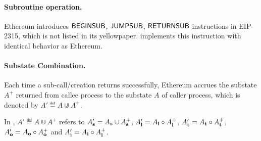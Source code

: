 
\paragraph{Subroutine operation.} Ethereum introduces $\mathsf{BEGINSUB}$, $\mathsf{JUMPSUB}$, $\mathsf{RETURNSUB}$ instructions in EIP-2315, which is not listed in its yellowpaper. 
{\name} implements this instruction with identical behavior as Ethereum.

\paragraph{Substate Combination.} 
Each time a sub-call/creation returns successfully, Ethereum accrues the substate $A^+$ returned from callee process to the substate $A$ of caller process, which is denoted by $A'\eqdef A\Cup A^+$. 

In {\name}, $A'\eqdef A\Cup A^+$ refers to $A'_{\bf s}=A_{\bf s}\cup A^+_{\bf s}$, $A'_{\bf l}=A_{\bf l}\circ A^+_{\bf l}$,  $A'_{\bf t}=A_{\bf t}\circ A^+_{\bf t}$, $A'_{\bf o}=A_{\bf o}\circ A^+_{\bf o}$ and $A'_{\bf i}=A_{\bf i}\circ A^+_{\bf i}$. 


